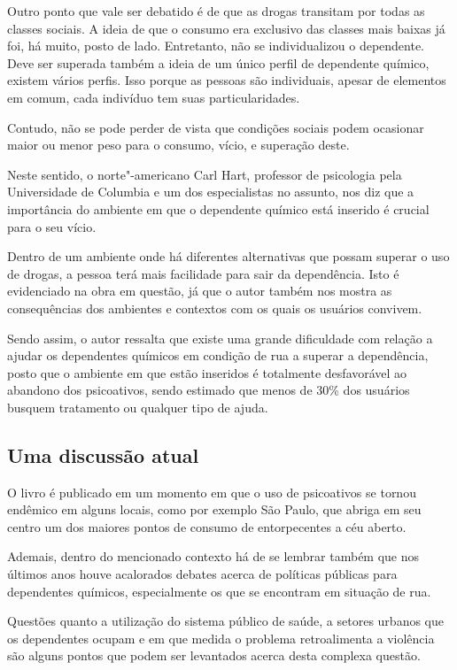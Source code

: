 Outro ponto que vale ser debatido é de que as drogas transitam por todas
as classes sociais. A ideia de que o consumo era exclusivo das classes
mais baixas já foi, há muito, posto de lado. Entretanto, não se
individualizou o dependente. Deve ser superada também a ideia de um
único perfil de dependente químico, existem vários perfis. Isso porque
as pessoas são individuais, apesar de elementos em comum, cada indivíduo
tem suas particularidades.

Contudo, não se pode perder de vista que condições sociais podem
ocasionar maior ou menor peso para o consumo, vício, e superação deste.

Neste sentido, o norte"-americano Carl Hart, professor de psicologia pela
Universidade de Columbia e um dos especialistas no assunto, nos diz que a
importância do ambiente em que o dependente químico está inserido é
crucial para o seu vício.

Dentro de um ambiente onde há diferentes alternativas que possam superar
o uso de drogas, a pessoa terá mais facilidade para sair da dependência.
Isto é evidenciado na obra em questão, já que o autor também nos mostra
as consequências dos ambientes e contextos com os quais os usuários
convivem.

Sendo assim, o autor ressalta que existe uma grande dificuldade com
relação a ajudar os dependentes químicos em condição de rua a superar a
dependência, posto que o ambiente em que estão inseridos é totalmente
desfavorável ao abandono dos psicoativos, sendo estimado que menos de
30\% dos usuários busquem tratamento ou qualquer tipo de ajuda.

\subsection{Uma discussão atual}

O livro é publicado em um momento em que o uso de psicoativos se tornou
endêmico em alguns locais, como por exemplo São Paulo, que abriga em seu
centro um dos maiores pontos de consumo de entorpecentes a céu aberto.

Ademais, dentro do mencionado contexto há de se lembrar também que nos
últimos anos houve acalorados debates acerca de políticas públicas para
dependentes químicos, especialmente os que se encontram em situação de
rua.

Questões quanto a utilização do sistema público de saúde, a setores
urbanos que os dependentes ocupam e em que medida o problema
retroalimenta a violência são alguns pontos que podem ser levantados
acerca desta complexa questão.

